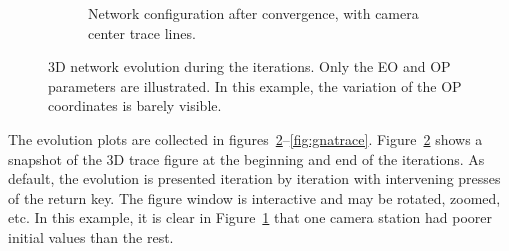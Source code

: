 \documentclass{article}
\begin{document}
\begin{figure}
\begin{subfigure}[b]{0.49\textwidth}
    \caption{Network configuration after convergence, with camera
      center trace lines.}
    \label{fig:camxfinal}
  \end{subfigure}
  \caption{3D network evolution during the iterations. Only the EO and
    OP parameters are illustrated. In this example, the variation of
    the OP coordinates is barely visible. }\label{fig:net3DTrace}
\end{figure}

The evolution plots are collected in
figures~\ref{fig:net3DTrace}--\ref{fig:gnatrace}.
Figure~\ref{fig:net3DTrace} shows a snapshot of the 3D trace figure at
the beginning and end of the iterations. As default, the evolution is
presented iteration by iteration with intervening presses of the
return key. The figure window is interactive and may be rotated,
zoomed, etc. In this example, it is clear in
Figure~\ref{fig:camxfinal} that one camera station had poorer initial
values than the rest.
\end{document}
